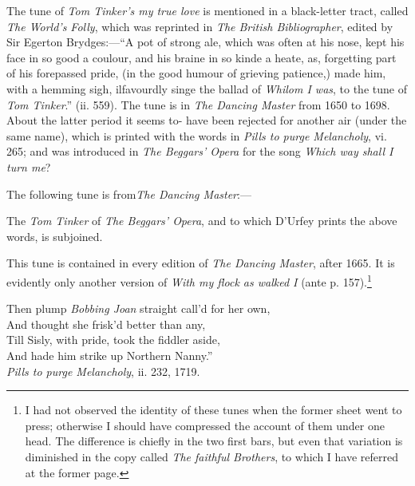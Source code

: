 
The tune of \textit{Tom Tinker's my true love} is mentioned in a black-letter tract,
called \textit{The World's Folly}, which was reprinted in \textit{The British Bibliographer},
edited by Sir Egerton Brydges:—“A pot of strong ale, which was often at his nose,
kept his face in so good a coulour, and his braine in so kinde a heate, as, forgetting
part of his forepassed pride, (in the good humour of grieving patience,) made him,
with a hemming sigh, ilfavourdly singe the ballad of \textit{Whilom I was}, to the tune of
\textit{Tom Tinker}.” (ii. 559). The tune is in \textit{The Dancing Master} from 1650 to
1698. About the latter period it seems to- have been rejected for another air
(under the same name), which is printed with the words in \textit{Pills to purge
Melancholy}, vi. 265; and was introduced in \textit{The Beggars’ Opera} for the song
\textit{Which way shall I turn me}?

The following tune is from\textit{The Dancing Master}:—



\pagebreak

The \textit{Tom Tinker} of \textit{The Beggars’ Opera}, and to which D’Urfey prints the
above words, is subjoined.




This tune is contained in every edition of \textit{The Dancing Master}, after 1665.
It is evidently only another version of \textit{With my flock as walked I }(ante p. 157).\footnote{\textit{}
I had not observed the identity of these tunes when
the former sheet went to press; otherwise I should have
compressed the account of them under one head. The
difference is chiefly in the two first bars, but even that
variation is diminished in the copy called\textit{ The faithful
Brothers}, to which I have referred at the former page.}
\begin{scverse}
\begin{altverse}
Then plump \textit{Bobbing Joan} straight call’d for her own,\\
And thought she frisk’d better than any,\\
Till Sisly, with pride, took the fiddler aside,\\
And hade him strike up Northern Nanny.”\\
\attribution \textit{Pills to purge Melancholy}, ii. 232, 1719.
\end{altverse}
\end{scverse}

